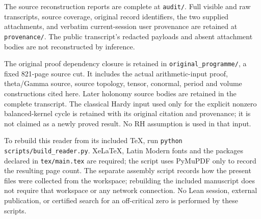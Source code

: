 \documentclass[11pt,a4paper,oneside,openany]{book}
\theoremstyle{definition}
\begin{document}
The source reconstruction reports are complete at \texttt{audit/}. Full
visible and raw transcripts, source coverage, original record identifiers,
the two supplied attachments, and verbatim current-session user provenance
are retained at \texttt{provenance/}. The public transcript's redacted
payloads and absent attachment bodies are not reconstructed by inference.

The original proof dependency closure is retained in
\texttt{original\_programme/}, a fixed 821-page source cut. It includes
the actual arithmetic-input proof, theta/Gamma source, source topology,
tensor, conormal, period and volume constructions cited here. Later
holonomy source bodies are retained in the complete transcript. The
classical Hardy input used only for the explicit nonzero balanced-kernel
cycle is retained with its original citation and provenance; it is not
claimed as a newly proved result. No RH assumption is used in that input.

To rebuild this reader from its included TeX, run
\texttt{python scripts/build\_reader.py}. XeLaTeX, Latin Modern fonts
and the packages declared in \texttt{tex/main.tex} are required; the
script uses PyMuPDF only to record the resulting page count. The separate
assembly script records how the present files were collected from the
workspace; rebuilding the included manuscript does not require that
workspace or any network connection. No Lean session, external
publication, or certified search for an off-critical zero is performed
by these scripts.
\end{document}
